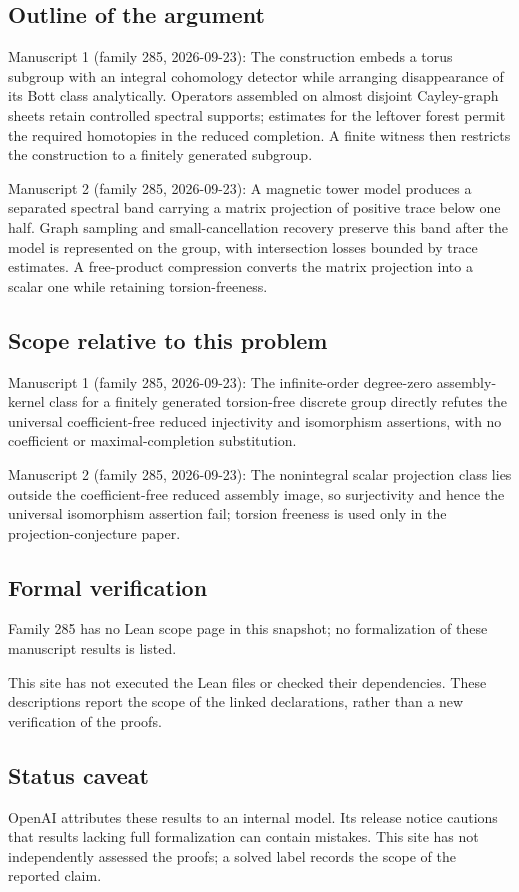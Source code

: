 \documentclass[11pt]{article}
\begin{document}
\subsection{Outline of the argument}
Manuscript 1 (family 285, 2026-09-23): The construction embeds a torus subgroup with an integral cohomology detector while arranging disappearance of its Bott class analytically. Operators assembled on almost disjoint Cayley-graph sheets retain controlled spectral supports; estimates for the leftover forest permit the required homotopies in the reduced completion. A finite witness then restricts the construction to a finitely generated subgroup.

Manuscript 2 (family 285, 2026-09-23): A magnetic tower model produces a separated spectral band carrying a matrix projection of positive trace below one half. Graph sampling and small-cancellation recovery preserve this band after the model is represented on the group, with intersection losses bounded by trace estimates. A free-product compression converts the matrix projection into a scalar one while retaining torsion-freeness.

\subsection{Scope relative to this problem}
Manuscript 1 (family 285, 2026-09-23): The infinite-order degree-zero assembly-kernel class for a finitely generated torsion-free discrete group directly refutes the universal coefficient-free reduced injectivity and isomorphism assertions, with no coefficient or maximal-completion substitution.

Manuscript 2 (family 285, 2026-09-23): The nonintegral scalar projection class lies outside the coefficient-free reduced assembly image, so surjectivity and hence the universal isomorphism assertion fail; torsion freeness is used only in the projection-conjecture paper.

\subsection{Formal verification}
Family 285 has no Lean scope page in this snapshot; no formalization of these manuscript results is listed.

This site has not executed the Lean files or checked their dependencies. These descriptions report the scope of the linked declarations, rather than a new verification of the proofs.

\subsection{Status caveat}
OpenAI attributes these results to an internal model. Its release notice cautions that results lacking full formalization can contain mistakes. This site has not independently assessed the proofs; a solved label records the scope of the reported claim.
\end{document}
